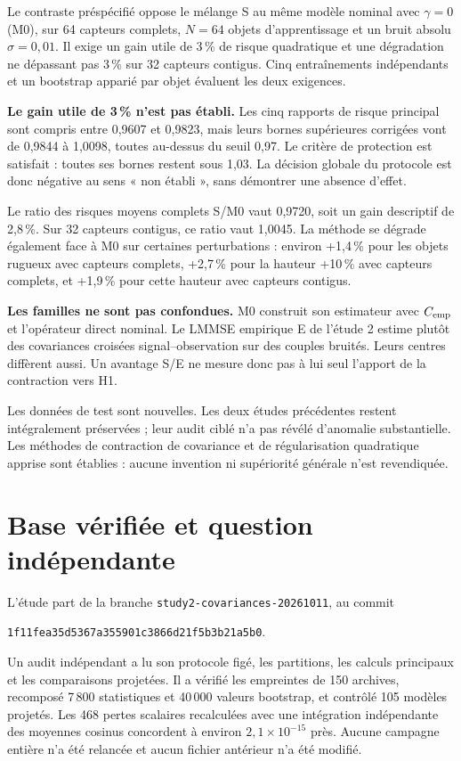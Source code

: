 \documentclass[11pt,a4paper]{article}
\begin{document}
Le contraste préspécifié oppose le mélange S au même modèle nominal avec $\gamma=0$ (M0), sur 64 capteurs complets, $N=64$ objets d'apprentissage et un bruit absolu $\sigma=0,01$. Il exige un gain utile de 3\,\% de risque quadratique et une dégradation ne dépassant pas 3\,\% sur 32 capteurs contigus. Cinq entraînements indépendants et un bootstrap apparié par objet évaluent les deux exigences.

\textbf{Le gain utile de 3\,\% n'est pas établi.} Les cinq rapports de risque principal sont compris entre 0,9607 et 0,9823, mais leurs bornes supérieures corrigées vont de 0,9844 à 1,0098, toutes au-dessus du seuil 0,97. Le critère de protection est satisfait : toutes ses bornes restent sous 1,03. La décision globale du protocole est donc négative au sens « non établi », sans démontrer une absence d'effet.

Le ratio des risques moyens complets S/M0 vaut 0,9720, soit un gain descriptif de 2,8\,\%. Sur 32 capteurs contigus, ce ratio vaut 1,0045. La méthode se dégrade également face à M0 sur certaines perturbations : environ +1,4\,\% pour les objets rugueux avec capteurs complets, +2,7\,\% pour la hauteur +10\,\% avec capteurs complets, et +1,9\,\% pour cette hauteur avec capteurs contigus.

\textbf{Les familles ne sont pas confondues.} M0 construit son estimateur avec $C_{\rm emp}$ et l'opérateur direct nominal. Le LMMSE empirique E de l'étude 2 estime plutôt des covariances croisées signal--observation sur des couples bruités. Leurs centres diffèrent aussi. Un avantage S/E ne mesure donc pas à lui seul l'apport de la contraction vers H1.

Les données de test sont nouvelles. Les deux études précédentes restent intégralement préservées ; leur audit ciblé n'a pas révélé d'anomalie substantielle. Les méthodes de contraction de covariance et de régularisation quadratique apprise sont établies : aucune invention ni supériorité générale n'est revendiquée.

\newpage
\section{Base vérifiée et question indépendante}
L'étude part de la branche \texttt{study2-covariances-20261011}, au commit\par
{\small\texttt{1f11fea35d5367a355901c3866d21f5b3b21a5b0}}.

Un audit indépendant a lu son protocole figé, les partitions, les calculs principaux et les comparaisons projetées. Il a vérifié les empreintes de 150 archives, recomposé 7\,800 statistiques et 40\,000 valeurs bootstrap, et contrôlé 105 modèles projetés. Les 468 pertes scalaires recalculées avec une intégration indépendante des moyennes cosinus concordent à environ $2,1\times10^{-15}$ près. Aucune campagne entière n'a été relancée et aucun fichier antérieur n'a été modifié.
\end{document}

